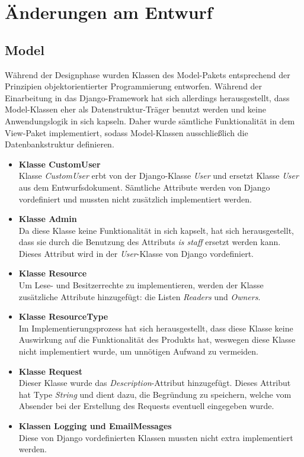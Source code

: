 \documentclass[parskip=full,11pt]{scrartcl}
\begin{document}
 \newpage
 \section{Änderungen am Entwurf}
 
 \subsection{Model}
Während der Designphase wurden Klassen des Model-Pakets entsprechend der Prinzipien objektorientierter Programmierung entworfen. Während der Einarbeitung in das Django-Framework hat sich allerdings herausgestellt, dass Model-Klassen eher als Datenstruktur-Träger benutzt werden und keine Anwendungslogik in sich kapseln. Daher wurde sämtliche Funktionalität in dem View-Paket implementiert, sodass Model-Klassen ausschließlich die Datenbankstruktur definieren.
 
\begin{itemize}
\item \textbf{Klasse CustomUser}\\
Klasse \textit{CustomUser} erbt von der Django-Klasse \textit{User} und ersetzt Klasse \textit{User} aus dem Entwurfsdokument. Sämtliche Attribute werden von Django vordefiniert und mussten nicht zusätzlich implementiert werden.

\item \textbf{Klasse Admin}\\
Da diese Klasse keine Funktionalität in sich kapselt, hat sich herausgestellt, dass sie durch die Benutzung des Attributs \textit{is staff} ersetzt werden kann. Dieses Attribut wird in der \textit{User}-Klasse von Django vordefiniert.
 
\item\textbf{Klasse Resource}\\
Um Lese- und Besitzerrechte zu implementieren, werden der Klasse zusätzliche Attribute hinzugefügt: die Listen \textit{Readers} und \textit{Owners}.

\item \textbf{Klasse ResourceType}\\
Im Implementierungsprozess hat sich herausgestellt, dass diese Klasse keine Auswirkung auf die Funktionalität des Produkts hat, weswegen diese Klasse nicht implementiert wurde, um unnötigen Aufwand zu vermeiden.

\item \textbf{Klasse Request}\\
Dieser Klasse wurde das \textit{Description}-Attribut hinzugefügt. Dieses Attribut hat Type \textit{String} und dient dazu, die Begründung zu speichern, welche vom Absender bei der Erstellung des Requests eventuell eingegeben wurde.

\item \textbf{Klassen Logging und EmailMessages}\\
Diese von Django vordefinierten Klassen mussten nicht extra implementiert werden. 
\end{itemize}
\end{document}
